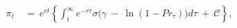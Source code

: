 \begin{equation}
\begin{split}
    \pi_{t} \
    & = \ e^{rt} \left\{ \int_{t}^{\infty} e^{-r\tau} \sigma \big( \gamma \ - \ \ln(1 - Pr_{\tau}) \big) d\tau \ + \ \mathcal{C} \right\},
\end{split}
\label{Equation:Social-Planners-Problem_Euler-Equation}
\end{equation}